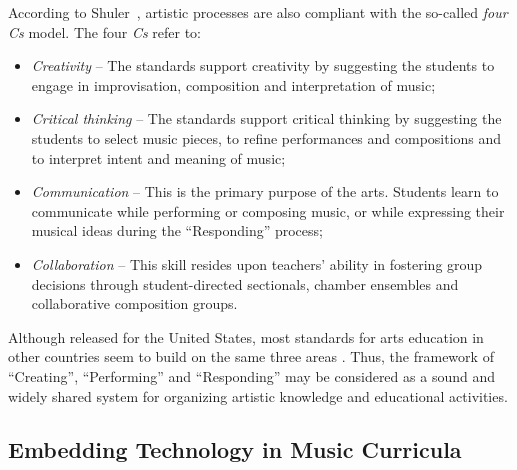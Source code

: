 \documentclass[10pt,journal,compsoc]{IEEEtran}
\begin{document}
According to Shuler~\cite{shuler2011music}, artistic processes are also compliant with the so-called \textit{four Cs} model. The four \textit{Cs} refer to:
\begin{itemize}
	\item \textit{Creativity} -- The standards support creativity by suggesting the students to engage in improvisation, composition and interpretation of music;
	\item \textit{Critical thinking} -- The standards support critical thinking by suggesting the students to select music pieces, to refine performances and compositions and to interpret intent and meaning of music;
	\item \textit{Communication} -- This is the primary purpose of the arts. Students learn to communicate while performing or composing music, or while expressing their musical ideas during the ``Responding'' process;
	\item \textit{Collaboration} -- This skill resides upon teachers' ability in fostering group decisions through student-directed sectionals, chamber ensembles and collaborative composition groups.
	
\end{itemize}

Although released for the United States, most standards for arts education in other countries seem to build on the same three areas \cite{AC, AEKLA, NCE, PSC}. Thus, the framework of ``Creating'', ``Performing'' and ``Responding'' may be considered as a sound and widely shared system for organizing artistic knowledge and educational activities.

\subsection{Embedding Technology in Music Curricula}
\label{subsubsec:MTC}
\end{document}
